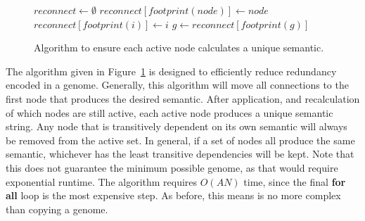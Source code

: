 \documentclass[journal]{IEEEtran}
\begin{document}
\begin{figure}
  \begin{algorithmic}
    \State $reconnect \leftarrow \emptyset$
      \State $reconnect[footprint(node)] \leftarrow node$
    \EndFor
      \State $reconnect[footprint(i)] \leftarrow i$
    \EndFor
          \State $g \leftarrow reconnect[footprint(g)]$
        \EndIf
      \EndIf
    \EndFor
  \EndProcedure
  \end{algorithmic}
  \caption{Algorithm to ensure each active node calculates
           a unique semantic.}
  \label{fig:simplify}
\end{figure}

The  algorithm given in Figure~\ref{fig:simplify} is designed
to efficiently reduce redundancy encoded in a genome.  Generally, this
algorithm will move all connections to the first node that produces the desired
semantic.  After application, and recalculation of which nodes are still
active, each active node produces a unique semantic string.  Any node that is
transitively dependent on its own semantic will always be removed from
the active set.  In general, if a set of nodes all produce the same semantic,
whichever has the least transitive dependencies will be kept.  Note that this
does not guarantee the minimum possible genome, as that would require
exponential runtime.  The  algorithm requires $O(AN)$ time,
since the final \textbf{for all} loop is the most expensive step.  As before, this means
 is no more complex than copying a genome.
\end{document}
